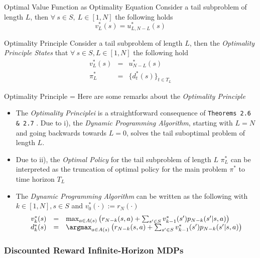 \documentclass[11pt,a4paper]{article}
\begin{document}
  \begin{theorem}{Optimal Value Function as Optimality Equation}
    Consider a tail subproblem of length $L$, then $\forall\ s\in S,\ L\in[1,N]$ the following holds
    \[ v_L^*(s)=u_{L,N-L}^*(s) \]
  \end{theorem}

  \begin{theorem}{Optimality Principle}
    Consider a tail subproblem of length $L$, then the \textit{Optimality Principle States} that $\forall\ s\in S,L\in[1,N]$ the following hold
    \[\begin{array}{rcl}
      v_L^*(s)&=&u_{N-L}^*(s)\\
      \pi_L^*&=&\{d_t^*(s)\}_{t\in T_L}
    \end{array}\]
  \end{theorem}

  \begin{remark}{Optimality Principle}
    \everymath={\displaystyle}
    Here are some remarks about the \textit{Optimality Principle}
    \begin{itemize}
      \item The \textit{Optimality Principlei} is a straightforward consequence of \texttt{Theorems 2.6 \& 2.7} .
      \ITEM Due to i), the \textit{Dynamic Programming Algorithm}, starting with $L=N$ and going backwards towards $L=0$, solves the tail suboptimal problem of length $L$.
      \item Due to ii), the \textit{Optimal Policy} for the tail subproblem of length $L$ $\pi_L^*$ can be interpreted as the truncation of optimal policy for the main problem $\pi^*$ to time horizon $T_L$
      \item The \textit{Dynamic Programming Algorithm} can be written as the following with $k\in[1,N],s\in S$ and $v_0^*(\cdot):=r_N(\cdot)$
      \[\begin{array}{rcl}
        v_k^*(s)&=&\max_{a\in A(s)}\left(r_{N-k}(s,a)+\sum_{s'\in S}v_{k-1}^*(s')p_{N-k}(s'|s,a)\right)\\
        d_k^*(s)&=&\argmax_{a\in A(s)}\left(r_{N-k}(s,a)+\sum_{s'\in S}v_{k-1}^*(s')p_{N-k}(s'|s,a)\right)
      \end{array}\]
    \end{itemize}
  \end{remark}

\subsubsection{Discounted Reward Infinite-Horizon MDPs}
\end{document}
